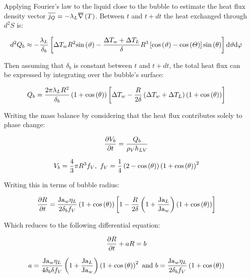 \npar



Applying Fourier's law to the liquid close to the bubble to estimate the heat flux density vector $\overline{j_{Q}}=-\lambda_{L} \overline{\nabla}\left({T}\right)$. Between $t$ and $t+dt$ the heat exchanged through $d^{2}S$ is:

\begin{align}
d^{2}Q_{b} \approx -\frac{\lambda_{L}}{\delta_{b}}\left[  \Delta T_{w}R^{2}\mathrm{sin}\left( \vartheta \right)-\frac{\Delta T_{w}+\Delta T_{L}}{\delta}R^{3}\left[  \mathrm{cos}\left( \vartheta \right)-\mathrm{cos}\left( \varTheta \right)  \right] \mathrm{sin}\left( \theta \right)  \right] \mathrm{d}\vartheta \mathrm{d}\varphi
\end{align}

\npar
Then assuming that $\delta_{b}$ is constant between $t$ and $t+dt$, the total heat flux can be expressed by integrating over the bubble's surface:

\begin{align}
Q_{b}=\frac{2\pi \lambda_{L} R^{2}}{\delta_{b}} \left( 1+\mathrm{cos}\left( \theta \right)  \right) \left[ \Delta T_{w} - \frac{R}{2\delta}\left(  \Delta T_{w} + \Delta T_{L}  \right)  \left( 1 + \mathrm{cos}\left( \theta \right) \right)  \right]
\end{align}

Writing the mass balance by considering that the heat flux contributes solely to phase change:

\begin{align}
\frac{\partial{V_{b}}}{\partial t}=\frac{Q_{b}}{\rho_{V}h_{LV}}
\end{align}

\begin{equation}
V_{b} = \frac{4}{3}\pi R^{3} f_{V},\ f_{V} = \frac{1}{4}\parth{2-\cos{\theta}}\parth{1+\cos{\theta}}^{2}
\end{equation}

Writing this in terms of bubble radius:

\begin{align}
\frac{\partial{R}}{\partial t} = \frac{\mathrm{Ja}_{w} \eta_{L}}{2 \delta_{b} f_{V} } \left( 1+\mathrm{cos}\left( \theta \right) \right) \left[ 1 - \frac{R}{2\delta}\left(  1 + \frac{\mathrm{Ja}_{L}}{\mathrm{Ja}_{w}}  \right) \left(  1 + \mathrm{cos}\left( \theta \right)  \right)  \right]
\end{align}

Which reduces to the following differential equation:

\begin{equation}
\frac{\partial{R}}{\partial t} + aR = b
\label{eq:diff_eq_growth}
\end{equation}

\begin{equation}
a = \frac{\mathrm{Ja}_{w}\eta_{L}}{4 \delta_{b} \delta f_{V} } \left( 1 + \frac{\mathrm{Ja}_{L}}{\mathrm{Ja}_{w}}  \right) \left( 1 + \mathrm{cos}\left( \theta \right)  \right)^{2} \ \text{and} \  b = \frac{\mathrm{Ja}_{w}\eta_{L}}{2 \delta_{b} f_{V} }\left( 1 + \mathrm{cos}\left( \theta \right)  \right)
\end{equation}


